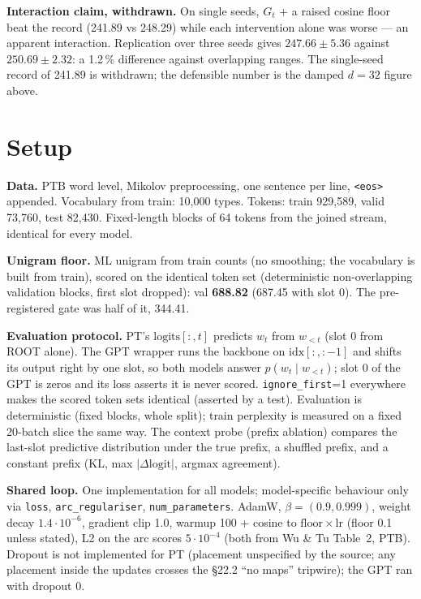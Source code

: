 \documentclass[10pt,a4paper]{article}
\newcommand{\pmm}[2]{\ensuremath{#1 \pm #2}}
\begin{document}
\textbf{Interaction claim, withdrawn.} On single seeds, $G_t$ + a raised cosine floor beat
the record (241.89 vs 248.29) while each intervention alone was worse --- an apparent
interaction. Replication over three seeds gives \pmm{247.66}{5.36} against \pmm{250.69}{2.32}:
a 1.2\,\% difference against overlapping ranges. The single-seed record of 241.89 is
withdrawn; the defensible number is the damped $d=32$ figure above.

\section{Setup}

\textbf{Data.} PTB word level, Mikolov preprocessing, one sentence per line,
\texttt{<eos>} appended. Vocabulary from train: 10{,}000 types. Tokens: train 929{,}589,
valid 73{,}760, test 82{,}430. Fixed-length blocks of 64 tokens from the joined stream,
identical for every model.

\textbf{Unigram floor.} ML unigram from train counts (no smoothing; the vocabulary is built
from train), scored on the identical token set (deterministic non-overlapping validation
blocks, first slot dropped): val \textbf{688.82} (687.45 with slot 0). The pre-registered
gate was half of it, 344.41.

\textbf{Evaluation protocol.} PT's $\mathrm{logits}[:,t]$ predicts $w_t$ from $w_{<t}$
(slot 0 from ROOT alone). The GPT wrapper runs the backbone on $\mathrm{idx}[:, :-1]$ and
shifts its output right by one slot, so both models answer $p(w_t \mid w_{<t})$; slot 0 of
the GPT is zeros and its loss asserts it is never scored. \texttt{ignore\_first}=1
everywhere makes the scored token sets identical (asserted by a test). Evaluation is
deterministic (fixed blocks, whole split); train perplexity is measured on a fixed 20-batch
slice the same way. The context probe (prefix ablation) compares the last-slot predictive
distribution under the true prefix, a shuffled prefix, and a constant prefix (KL, max
$|\Delta\mathrm{logit}|$, argmax agreement).

\textbf{Shared loop.} One implementation for all models; model-specific behaviour only via
\texttt{loss}, \texttt{arc\_regulariser}, \texttt{num\_parameters}. AdamW,
$\beta=(0.9, 0.999)$, weight decay $1.4\!\cdot\!10^{-6}$, gradient clip 1.0, warmup 100 +
cosine to $\mathrm{floor}\times\mathrm{lr}$ (floor 0.1 unless stated), L2 on the arc scores
$5\!\cdot\!10^{-4}$ (both from Wu \& Tu Table~2, PTB). Dropout is not implemented for PT
(placement unspecified by the source; any placement inside the updates crosses the \S22.2
``no maps'' tripwire); the GPT ran with dropout 0.
\end{document}
